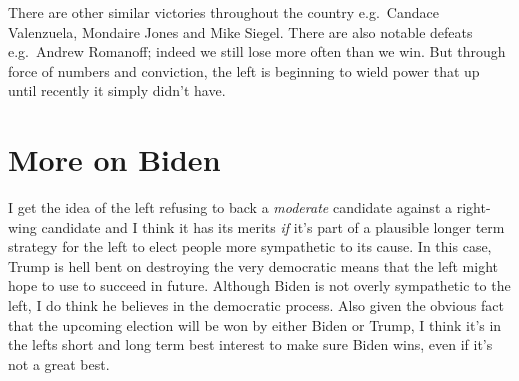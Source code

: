 \documentclass[]{book}
\begin{document}
There are other similar victories throughout the country e.g.~Candace Valenzuela, Mondaire Jones and Mike Siegel. There are also notable defeats e.g.~Andrew Romanoff; indeed we still lose more often than we win. But through force of numbers and conviction, the left is beginning to wield power that up until recently it simply didn't have.

\hypertarget{more-on-biden}{%
\chapter{More on Biden}\label{more-on-biden}}

I get the idea of the left refusing to back a \emph{moderate} candidate against a right-wing candidate and I think it has its merits \emph{if} it's part of a plausible longer term strategy for the left to elect people more sympathetic to its cause. In this case, Trump is hell bent on destroying the very democratic means that the left might hope to use to succeed in future. Although Biden is not overly sympathetic to the left, I do think he believes in the democratic process. Also given the obvious fact that the upcoming election will be won by either Biden or Trump, I think it's in the lefts short and long term best interest to make sure Biden wins, even if it's not a great best.


\end{document}
